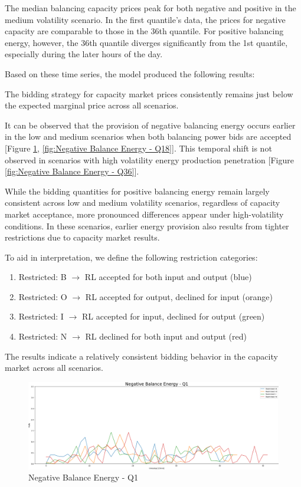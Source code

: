 The median  balancing capacity prices peak for
both negative and positive in the medium volatility scenario.
In the first quantile's data, the prices for negative capacity are comparable to those in the 36th quantile.
For positive balancing energy, however, the 36th quantile diverges significantly from the 1st quantile,
especially during the later hours of the day.

Based on these time series, the model produced the following results:

The bidding strategy for capacity market prices consistently remains just below the expected marginal price across all scenarios.

It can be observed that the provision of negative balancing energy occurs earlier in the low and medium scenarios
when both balancing power bids are accepted [Figure \ref{fig:Negative Balance Energy - Q1}, \ref{fig:Negative Balance Energy - Q18}].
This temporal shift is not observed in scenarios with high volatility energy production penetration [Figure \ref{fig:Negative Balance Energy - Q36}].

While the bidding quantities for positive balancing energy remain largely consistent across low and medium volatility scenarios,
regardless of capacity market acceptance, more pronounced differences appear under high-volatility conditions.
In these scenarios, earlier energy provision also results from tighter restrictions due to capacity market results.

To aid in interpretation, we define the following restriction categories:
\begin{enumerate}
	\item Restricted: B $\rightarrow$ RL accepted for both input and output (blue)
	\item Restricted: O $\rightarrow$ RL accepted for output, declined for input (orange)
	\item Restricted: I $\rightarrow$ RL accepted for input, declined for output (green)
	\item Restricted: N $\rightarrow$ RL declined for both input and output (red)
\end{enumerate}

The results indicate a relatively consistent bidding behavior in the capacity market across all scenarios.

\begin{figure}[!h]
	\includegraphics[width=1\linewidth]{pictures/results/Negative Balance Energy - Q1.png}
	\caption{Negative Balance Energy - Q1}
	\label{fig:Negative Balance Energy - Q1}
\end{figure}

